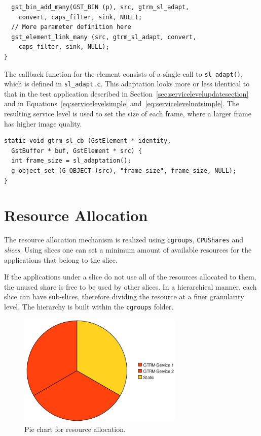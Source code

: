 \documentclass[nobiblatex]{LTHthesis}
\begin{document}
\begin{lstlisting}
  gst_bin_add_many(GST_BIN (p), src, gtrm_sl_adapt, 
	convert, caps_filter, sink, NULL);
  // More parameter definition here
  gst_element_link_many (src, gtrm_sl_adapt, convert, 
	caps_filter, sink, NULL);
}
\end{lstlisting}

The callback function for the element consists of a single call 
to \texttt{sl\_adapt()}, which is defined in \texttt{sl\_adapt.c}. 
This adaptation looks more or less identical to that in the test 
application described in Section~\ref{sec:servicelevelupdatesection} and
in Equations~\ref{eq:servicelevelsimple} 
and~\ref{eq:servicelevelnotsimple}. The resulting service level is used to set the size of each frame, where a larger frame has higher image quality.

\begin{lstlisting}
static void gtrm_sl_cb (GstElement * identity, 
  GstBuffer * buf, GstElement * src) {
  int frame_size = sl_adaptation();
  g_object_set (G_OBJECT (src), "frame_size", frame_size, NULL);
}
\end{lstlisting}

\section{Resource Allocation}

The resource allocation mechanism is realized using \texttt{cgroups},
\texttt{CPUShares} and \emph{slices}. Using slices one can set a minimum
amount of available resources for the applications that belong to the slice.

If the applications under a slice do not use all of the resources allocated 
to them, the unused share is free to be used by other slices. In a
hierarchical manner, each slice can have sub-slices, therefore dividing the resource at a finer granularity level. The hierarchy is built within the
\texttt{cgroups} folder.

\begin{figure}[t]
  \centering
  \includegraphics[width=0.7\textwidth]{piechart.jpeg}
  \caption{Pie chart for resource allocation.}
  \label{fig:Piechart}
\end{figure}
\end{document}
